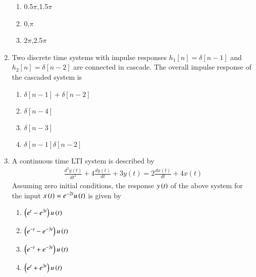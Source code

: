 \begin{enumerate}[label=\arabic*.,ref=\theenumi]
\begin{enumerate}
\item 0.5$\pi$,1.5$\pi$
\item 0,$\pi$
\item 2$\pi$,2.5$\pi$
\end{enumerate}
\solution

\item Two discrete time systems with impulse responses $h_1[n]=\delta[n-1]$ and $h_2[n]=\delta[n-2]$ are connected in cascade. The overall impulse response of the cascaded system is
\begin{enumerate}
    \item $\delta[n-1]+\delta[n-2]$
    \item $\delta[n-4]$
    \item $\delta[n-3]$
    \item $\delta[n-1]\delta[n-2]$
\end{enumerate}
\solution



\item A continuous time LTI system is described by
\begin{align}
    \frac{d^2y(t)}{dt^2}+4\frac{dy(t)}{dt}+3y(t) = 2\frac{dx(t)}{dt}+4x(t)\label{ec/2010/41/q}
\end{align}
Assuming zero initial conditions, the response $y\left(t\right)$ of the above system for the input $x\left(t\right)=e^{-2t}u\left(t\right)$ is given by
\begin{enumerate}
    \item $\left(e^t-e^{3t}\right)u\left(t\right)$
    \item $\left(e^{-t}-e^{-3t}\right)u\left(t\right)$
    \item $\left(e^{-t}+e^{-3t}\right)u\left(t\right)$
    \item $\left(e^{t}+e^{3t}\right)u\left(t\right)$
\end{enumerate}
\solution



\end{enumerate}
